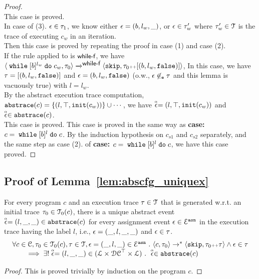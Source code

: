 \begin{proof}
  \\
  This case is proved.
  \\
In case of (3). $\mathtt{\epsilon} \in \mathtt{\tau}_1$, we know either $\mathtt{\epsilon} = (b, l_w, \_)$, or $\mathtt{\epsilon} \in \mathtt{\tau}_w'$ where $\mathtt{\tau}_w' \in \mathcal{T}$ is the trace of executing $c_w$ in an iteration.
\\
Then this case is proved by repeating the proof in case (1) and case (2).
  \\
  If the rule applied to is $\textsf{\small{while-f}}$, we have
  \\
  $
  {
    \langle {\;\ensuremath{\mathtt{while}}\;[b]^{l_w} \;\ensuremath{\mathtt{do}}\;c_w, \ensuremath{\mathtt{\tau}}_0} \rangle
    \xrightarrow{}^{\textsf{\small{while-f}}}
    \langle {
    \ensuremath{\mathtt{skip}},
    \ensuremath{\mathtt{\tau}}_0 {\scriptscriptstyle ++}[(b, l_w, \ensuremath{\mathtt{false}})]} \rangle
  }$,
  In this case, we have $\mathtt{\tau} = [(b, l_w, \mathtt{false})]$ and $\mathtt{\epsilon} = (b, l_w, \mathtt{false})$ (o.w., $\mathtt{\epsilon} \not\in_{\mathtt{e}} \mathtt{\tau}$ and this lemma is vacuously true) with $l = l_w$.
  \\
  By the abstract execution trace computation, $\mathtt{abs}{\mathtt{trace}}(c) = \{(l, \top, \mathtt{init}(c_w))\} \cup \cdots $, 
  we have $\stackrel{\scriptscriptstyle{\alpha}}{\mathtt{\epsilon}{}} = (l, \top, \mathtt{init}(c_w))$  and $\stackrel{\scriptscriptstyle{\alpha}}{\mathtt{\epsilon}{}} \in \mathtt{abs}{\mathtt{trace}}(c)$.
\\
  This case is proved.
  This case is proved in the same way as \textbf{case: $c = \;\mathtt{while}\; [b]^{l} \;\mathtt{do}\; c$}.
 By the induction hypothesis on $c_{s1}$ and $c_{s2}$ separately, and the same step as case (2). of \textbf{case: $c = \;\mathtt{while}\; [b]^{l} \;\mathtt{do}\; c$},
 we have this case proved.
\end{proof}

\subsection{Proof of Lemma~\ref{lem:abscfg_uniquex}}
\label{apdx:abscfg_uniquex}
\begin{lemma}
  For every program $c$ and
  an execution trace $\mathtt{\tau} \in \mathcal{T}$ that is generated w.r.t.
  an initial trace  $\mathtt{\tau}_0 \in \mathcal{T}_0(c)$,
  there is a unique abstract event $\stackrel{\scriptscriptstyle{\alpha}}{\mathtt{\epsilon}{}} = (l, \_, \_) \in \mathtt{abs}{\mathtt{trace}}(c)$ 
  for every assignment event $\mathtt{\epsilon} \in \mathcal{E}^{\mathtt{{asn}}}$ in the
  execution trace having the label $l$, i.e., $\mathtt{\epsilon} = (\_, l, \_, \_)$ and  $\mathtt{\epsilon} \in \mathtt{\tau}$.
%
\[
  \begin{array}{l}
    \forall c \in \mathcal{C}, \mathtt{\tau}_0 \in \mathcal{T}_0(c), \mathtt{\tau} \in \mathcal{T} ,  \mathtt{\epsilon} = (\_, l, \_) \in \mathcal{E}^{\mathtt{{asn}}} ~.~
\langle {c}, \mathtt{\tau}_0 \rangle \to^{*} \langle \mathtt{skip}, \mathtt{\tau}_0 {\scriptscriptstyle ++} \mathtt{\tau} \rangle 
\land \mathtt{\epsilon} \in \mathtt{\tau} 
\\
\qquad \implies \exists! \stackrel{\scriptscriptstyle{\alpha}}{\mathtt{\epsilon}{}} = (l, \_, \_) \in (\mathcal{L}\times \mathcal{DC}^{\top} \times \mathcal{L}) ~.~ 
\stackrel{\scriptscriptstyle{\alpha}}{\mathtt{\epsilon}{}} \in \mathtt{abs}{\mathtt{trace}}(c)
\end{array}
\]
\end{lemma}
\begin{proof}
  This is proved trivially by induction on the program $c$.
\end{proof}
%
%

